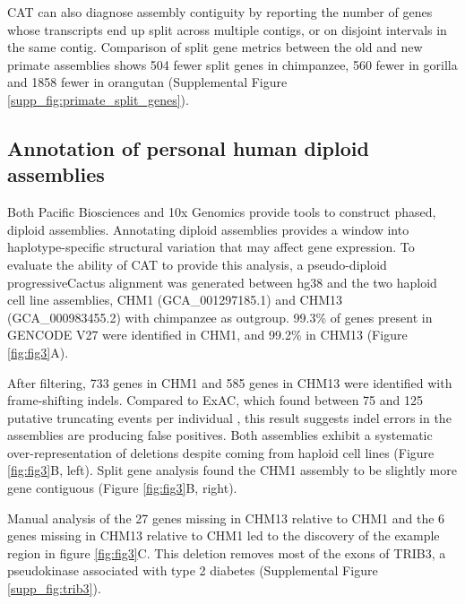 \documentclass[fleqn,10pt]{wlscirep}
\begin{document}
CAT can also diagnose assembly contiguity by reporting the number of genes whose transcripts end up split across multiple contigs, or on disjoint intervals in the same contig. Comparison of split gene metrics between the old and new primate assemblies shows 504 fewer split genes in chimpanzee, 560 fewer in gorilla and 1858 fewer in orangutan (Supplemental Figure \ref{supp_fig:primate_split_genes}).


\subsection*{Annotation of personal human diploid assemblies}
Both Pacific Biosciences \cite{chin2016phased,huddleston2016discovery} and 10x Genomics \cite{Weisenfeld070425} provide tools to construct phased, diploid assemblies. Annotating diploid assemblies provides a window into haplotype-specific structural variation that may affect gene expression. To evaluate the ability of CAT to provide this analysis, a pseudo-diploid progressiveCactus alignment was generated between hg38 and the two haploid cell line assemblies, CHM1 (GCA\_001297185.1) and CHM13 (GCA\_000983455.2) with chimpanzee as outgroup. 99.3\% of genes present in GENCODE V27 were identified in CHM1, and 99.2\% in CHM13 (Figure \ref{fig:fig3}A). 
    
	After filtering, 733 genes in CHM1 and 585 genes in CHM13 were identified with frame-shifting indels. Compared to ExAC, which found between 75 and 125 putative truncating events per individual \cite{karczewski2016exac}, this result suggests indel errors in the assemblies are producing false positives. Both assemblies exhibit a systematic over-representation of deletions despite coming from haploid cell lines (Figure \ref{fig:fig3}B, left). Split gene analysis found the CHM1 assembly to be slightly more gene contiguous (Figure \ref{fig:fig3}B, right).

Manual analysis of the 27 genes missing in CHM13 relative to CHM1 and the 6 genes missing in CHM13 relative to CHM1 led to the discovery of the example region in figure \ref{fig:fig3}C. This deletion removes most of the exons of TRIB3, a pseudokinase associated with type 2 diabetes \cite{shi2009association} (Supplemental Figure \ref{supp_fig:trib3}).
\end{document}
